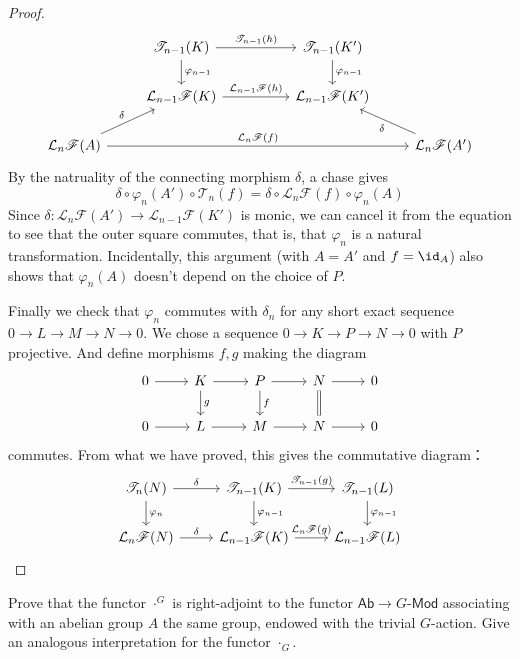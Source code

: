 \begin{proof}
\[\begin{tikzcd}[scale=0.8]
&\mathscr{T}_{n-1}(K)\ar[d,"\varphi_{n-1}"]\ar[rr,"\mathscr{T}_{n-1}(h)"]&&\mathscr{T}_{n-1}(K')\ar[d,"\varphi_{n-1}"]&\\
&\mathcal{L}_{n-1}\mathscr{F}(K)\ar[rr,"\mathcal{L}_{n-1}\mathscr{F}(h)"]&&\mathcal{L}_{n-1}\mathscr{F}(K')&\\
\mathcal{L}_n\mathscr{F}(A)\ar[ru,"\delta"]\ar[rrrr,"\mathcal{L}_n\mathscr{F}(f)"]&&&&\mathcal{L}_n\mathscr{F}(A')\ar[lu,"\delta"]
\end{tikzcd}\]
By the natruality of the connecting morphism $\delta$, a chase gives
\[\delta\circ\varphi_n(A')\circ\mathscr{T}_n(f)=\delta\circ\mathcal{L}_n\mathscr{F}(f)\circ\varphi_n(A)\]
Since $\delta:\mathcal{L}_n\mathscr{F}(A')\to\mathcal{L}_{n-1}\mathscr{F}(K')$ is monic, we can cancel it from the equation to see that the outer square commutes, that is, that $\varphi_n$ is a natural transformation.
Incidentally, this argument (with $A=A'$ and $f=\id_A$) also shows that $\varphi_n(A)$ doesn't depend on the choice of $P$.\par
Finally we check that $\varphi_n$ commutes with $\delta_n$ for any short exact sequence $0\to L\to M\to N\to 0$. We chose a sequence $0\to K\to P\to N\to 0$ with $P$ projective. And define morphisms $f,g$ making the diagram
\[\begin{tikzcd}
0\ar[r]&K\ar[d,"g"]\ar[r]&P\ar[d,"f"]\ar[r]&N\ar[d,equal]\ar[r]&0\\
0\ar[r]&L\ar[r]&M\ar[r]&N\ar[r]&0
\end{tikzcd}\]
commutes. From what we have proved, this gives the commutative diagram：
\[\begin{tikzcd}
\mathscr{T}_n(N)\ar[d,"\varphi_n"]\ar[r,"\delta"]&\mathscr{T}_{n-1}(K)\ar[d,"\varphi_{n-1}"]\ar[r,"\mathscr{T}_{n-1}(g)"]&\mathscr{T}_{n-1}(L)\ar[d,"\varphi_{n-1}"]\\
\mathcal{L}_n\mathscr{F}(N)\ar[r,"\delta"]&\mathcal{L}_{n-1}\mathscr{F}(K)\ar[r,"\mathcal{L}_n\mathscr{F}(g)"]&\mathcal{L}_{n-1}\mathscr{F}(L)
\end{tikzcd}\]
\end{proof}
\begin{exercise}
Prove that the functor $\cdot^{G}$ is right-adjoint to the functor $\mathsf{Ab}\to G$-$\mathsf{Mod}$ associating with an abelian group $A$ the same group, endowed with the trivial $G$-action. Give an analogous interpretation for the functor $\cdot_G$.
\end{exercise}
